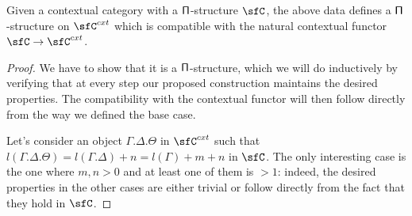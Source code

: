 \begin{prop}
  Given a contextual category with a $\operatorname{\mathsf{\Pi}}$-structure $\sfC$, the above data
  defines a $\operatorname{\mathsf{\Pi}}$-structure on $\sfC^{cxt}$ which is compatible with the natural
  contextual functor $\sfC\rightarrow\sfC^{cxt}$.
\end{prop}
\begin{proof}
  We have to
  show that it is a $\operatorname{\mathsf{\Pi}}$-structure, which we will do inductively by verifying
  that at every step our proposed construction maintains the desired properties.
  The compatibility with the contextual functor will then follow directly from
  the way we defined the base case.

  Let's consider an object $\Gamma.\Delta.\Theta$ in $\sfC^{cxt}$ such that
  $l(\Gamma.\Delta.\Theta)=l(\Gamma.\Delta)+n=l(\Gamma)+m+n$ in $\sfC$. The only
  interesting case is the one where $m,n>0$ and at least one of them is
  $>1$: indeed, the desired properties in the other cases are either
  trivial or follow directly from the fact that they hold in $\sfC$.


\end{proof}
